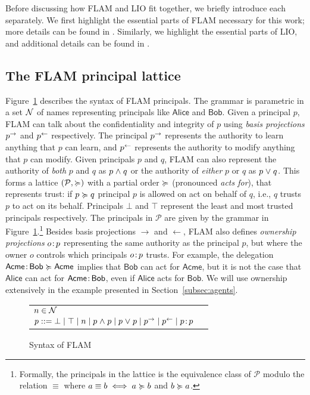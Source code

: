 Before discussing how FLAM and LIO fit together, we briefly introduce each separately. We first highlight the essential parts of FLAM necessary for this work; more details can be found in \cite{Arden:2015:FA:2859845.2859998}. Similarly, we highlight the essential parts of LIO, and additional details can be found in \cite{SRMMlio}.

\subsection{The FLAM principal lattice}
Figure~\ref{fig:flam-syntax} describes the syntax of FLAM principals. The grammar is parametric in a set $\mathcal{N}$ of names representing principals like $\mathsf{Alice}$ and $\mathsf{Bob}$. Given a principal $p$, FLAM can talk about the confidentiality and integrity of $p$ using \emph{basis projections} $p^{\rightarrow}$ and $p^{\leftarrow}$ respectively. The principal $p^{\rightarrow}$ represents the authority to learn anything that $p$ can learn, and $p^{\leftarrow}$ represents the authority to modify anything that $p$ can modify. Given principals $p$ and $q$, FLAM can also represent the authority of \emph{both} $p$ and $q$ as $p \mathrel{\land} q$ or the authority of \emph{either} $p$ or $q$ as $p \mathrel{\lor} q$. This forms a lattice $(\mathcal{P}, \succcurlyeq)$ with a partial order $\succcurlyeq$ (pronounced \emph{acts for}), that represents trust: if $p \succcurlyeq q$ principal $p$ is allowed on act on behalf of $q$, i.e., $q$ trusts $p$ to act on its behalf. Principals $\bot$ and $\top$ represent the least and most trusted principals respectively. The principals in $\mathcal{P}$ are given by the grammar in Figure~\ref{fig:flam-syntax}.\footnote{Formally, the principals in the lattice is the equivalence class of $\mathcal{P}$ modulo the relation $\equiv$ where $a \equiv b \iff a \succcurlyeq b$ and $b \succcurlyeq a$.} Besides basis projections $\rightarrow$ and $\leftarrow$, FLAM also defines \emph{ownership projections} $o \colon \!p$ representing the same authority as the principal $p$, but where the owner $o$ controls which principals $o \colon \!p$ trusts. For example, the delegation $\mathsf{Acme} \colon \!\mathsf{Bob} \succcurlyeq \mathsf{Acme}$ implies that $\mathsf{Bob}$ can act for $\mathsf{Acme}$, but it is not the case that $\mathsf{Alice}$ can act for $\mathsf{Acme} \colon \!\mathsf{Bob}$, even if $\mathsf{Alice}$ acts for $\mathsf{Bob}$. We will use ownership extensively in the example presented in Section~\ref{subsec:agents}.

\begin{figure}
    \centering
    \begin{tabular}{ll}
    $n \in \mathcal{N}$ \\
    $p ::= \bot \mid \top \mid n \mid p \mathrel{\land} p \mid p \mathrel{\lor} p \mid p^{\rightarrow} \mid p^{\leftarrow} \mid p \colon \!p$
    \end{tabular}
    \caption{Syntax of FLAM}
    \label{fig:flam-syntax}
\end{figure}


